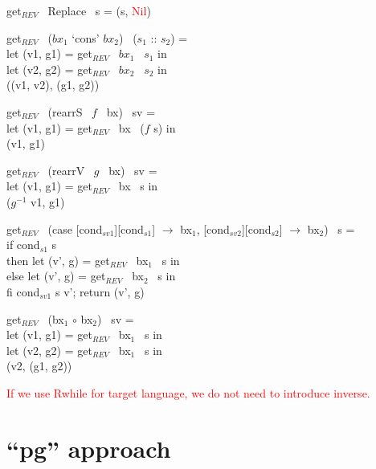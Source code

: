 \documentclass[runningheads]{llncs}
\newcommand{\revget}[2]{get$_{REV}$ \ {#1} \ {#2}}
\newcommand{\product}[2]{({#1} `cons' {#2})}
\newcommand{\tuple}[2]{(#1 :: #2)}
\newcommand{\rearrS}[2]{rearrS \ #1 \ #2}
\newcommand{\rearrV}[2]{rearrV \ #1 \ #2}
\newcommand{\casebx}[6]{case [#1][#2] $\to$ #3, [#4][#5] $\to$ #6}
\begin{document}
\noindent
\revget{Replace}{s} = (s, \textcolor{red}{Nil})

\noindent
\revget{\product{$bx_1$}{$bx_2$}}{\tuple{$s_1$}{$s_2$}} = \\
\hspace{5mm} let (v1, g1) = \revget{$bx_1$}{$s_1$} in\\
\hspace{5mm} let (v2, g2) = \revget{$bx_2$}{$s_2$} in\\
\hspace{5mm} ((v1, v2), (g1, g2))

\noindent
\revget{(\rearrS{$f$}{bx})}{s}{v} =\\
\hspace{5mm}let (v1, g1) = \revget{bx}{($f$ s)} in\\
\hspace{5mm}(v1, g1)

\noindent
\revget{(\rearrV{$g$}{bx})}{s}{v} =\\
\hspace{5mm} let (v1, g1) = \revget{bx}{s} in\\
\hspace{5mm} ($g^{-1}$ v1, g1)

\noindent
\revget{(\casebx{cond$_{sv1}$}{cond$_{s1}$}{bx$_1$}{cond$_{sv2}$}{cond$_{s2}$}{bx$_2$})}{s} =\\
\hspace{5mm} if {cond$_{s1}$ s}\\
\hspace{5mm} then let (v', g) = \revget{bx$_1$}{s} in\\
\hspace{5mm} else let (v', g) = \revget{bx$_2$}{s} in\\
\hspace{5mm} fi cond$_{sv1}$ s v'; return (v', g)

\noindent
\revget{(bx$_1$ $\circ$ bx$_2$)}{s}{v} =\\
\hspace{5mm} let (v1, g1) = \revget{bx$_1$}{s} in\\
\hspace{5mm} let (v2, g2) = \revget{bx$_1$}{s} in\\
\hspace{5mm} (v2, (g1, g2))

\textcolor{red}{If we use Rwhile for target language, we do not need to introduce inverse.}

\section{``pg'' approach}
\end{document}
